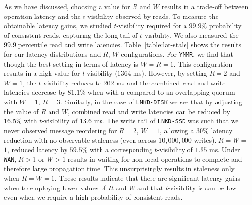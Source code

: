 \documentclass{vldb}
\begin{document}
As we have discussed, choosing a value for $R$ and $W$ results in a
trade-off between operation latency and the $t$-visibility observed by
reads. To measure the obtainable latency gains, we studied
$t$-visibility required for a $99.9\%$ probability of consistent
reads, capturing the long tail of $t$-visibility.  We also measured
the $99.9$ percentile read and write latencies.
Table~\ref{table:lat-stale} shows the results for our latency
distributions and $R$, $W$ configurations.  For \texttt{YMMR}, we find
that though the best setting in terms of latency is $W$$=$$R$$=$$1$.
This configuration results in a high value for $t$-visibility ($1364$
ms). However, by setting $R$$=$$2$ and $W$$=$$1$, the $t$-visibility
reduces to $202$ ms and the combined read and write latencies decrease
by $81.1\%$ when with a compared to an overlapping quorum with
$W$$=$$1$, $R$$=$$3$.  Similarly, in the case of \texttt{LNKD-DISK} we
see that by adjusting the value of $R$ and $W$, combined read and
write latencies can be reduced by $16.5\%$ with $t$-visibility of
$13.6$ ms.  The write tail of \texttt{LNKD-SSD} was such that we never
observed message reordering for $R$$=$$2$, $W$$=$$1$, allowing a 30\%
latency reduction with no observable staleness (even across
$10,000,000$ writes).  $R$$=$$W$$=$$1$, reduced latency by $59.5\%$
with a corresponding $t$-visibility of $1.85$ ms.  Under \texttt{WAN},
$R > 1$ or $W > 1$ results in waiting for non-local operations to
complete and therefore large propagation time.  This unsurprisingly
results in staleness only when $R$$=$$W$$=$$1$.  These results
indicate that there are significant latency gains when to employing
lower values of $R$ and $W$ and that $t$-visibility is can be low even
when we require a high probability of consistent reads.
\end{document}
